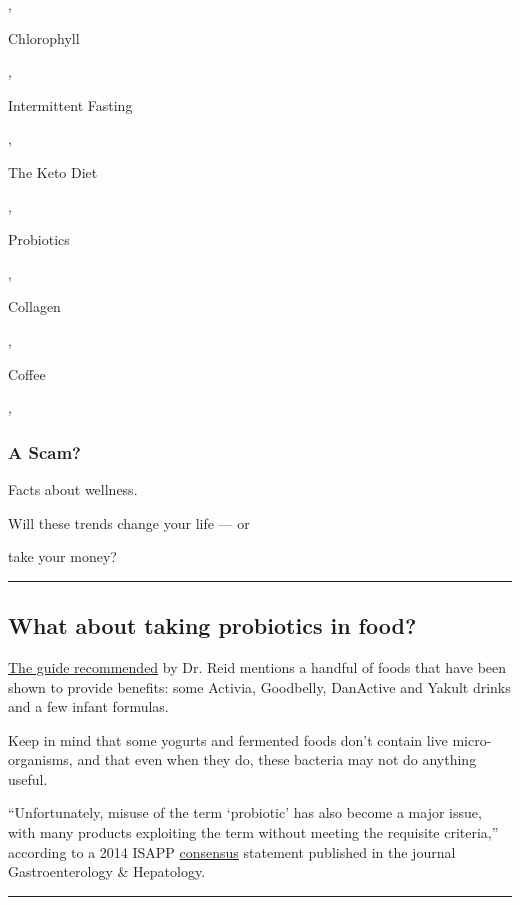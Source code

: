 ,

Chlorophyll

,

Intermittent Fasting

,

The Keto Diet

,

Probiotics

,

Collagen

,

Coffee

,

\hypertarget{a-scam}{%
\subsubsection{A Scam?}\label{a-scam}}

Facts about wellness.

Will these trends change your life --- or

take your money?

\begin{center}\rule{0.5\linewidth}{\linethickness}\end{center}

\hypertarget{what-about-taking-probiotics-in-food}{%
\subsection{What about taking probiotics in
food?}\label{what-about-taking-probiotics-in-food}}

\href{http://www.usprobioticguide.com/PBCFunctionalFoods.html?utm_source=funcfood_ind\&utm_medium=civ\&utm_campaign=USA_CHART}{The
guide recommended} by Dr. Reid mentions a handful of foods that have
been shown to provide benefits: some Activia, Goodbelly, DanActive and
Yakult drinks and a few infant formulas.

Keep in mind that some yogurts and fermented foods don't contain live
micro-organisms, and that even when they do, these bacteria may not do
anything useful.

``Unfortunately, misuse of the term `probiotic' has also become a major
issue, with many products exploiting the term without meeting the
requisite criteria,'' according to a 2014 ISAPP
\href{https://www.nature.com/articles/nrgastro.2014.66}{consensus}
statement published in the journal Gastroenterology \& Hepatology.

\begin{center}\rule{0.5\linewidth}{\linethickness}\end{center}

